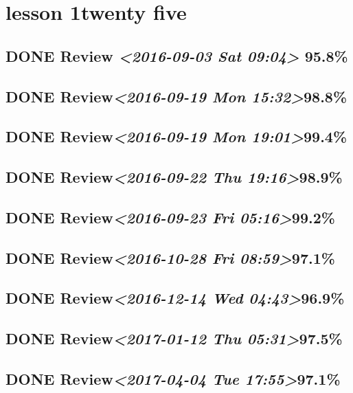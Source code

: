 \documentclass[11pt]{ctexart}
\begin{document}
\section{lesson 1twenty five}
\label{sec:orgf0aa635}
\subsection{{\bfseries\sffamily DONE} Review \textit{<2016-09-03 Sat 09:04> } 95.8\%}
\label{sec:org4d892ec}
\subsection{{\bfseries\sffamily DONE} Review\textit{<2016-09-19 Mon 15:32>}98.8\%}
\label{sec:org7015538}
\subsection{{\bfseries\sffamily DONE} Review\textit{<2016-09-19 Mon 19:01>}99.4\%}
\label{sec:orga094bb7}
\subsection{{\bfseries\sffamily DONE} Review\textit{<2016-09-22 Thu 19:16>}98.9\%}
\label{sec:org23b2658}
\subsection{{\bfseries\sffamily DONE} Review\textit{<2016-09-23 Fri 05:16>}99.2\%}
\label{sec:orga53401a}
\subsection{{\bfseries\sffamily DONE} Review\textit{<2016-10-28 Fri 08:59>}97.1\%}
\label{sec:org8dae62f}
\subsection{{\bfseries\sffamily DONE} Review\textit{<2016-12-14 Wed 04:43>}96.9\%}
\label{sec:org1a3927c}
\subsection{{\bfseries\sffamily DONE} Review\textit{<2017-01-12 Thu 05:31>}97.5\%}
\label{sec:orgcc9c7c2}
\subsection{{\bfseries\sffamily DONE} Review\textit{<2017-04-04 Tue 17:55>}97.1\%}
\label{sec:org7537f27}
\end{document}

